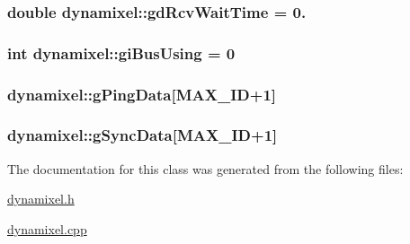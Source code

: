 \subsubsection[{gd\+Rcv\+Wait\+Time}]{\setlength{\rightskip}{0pt plus 5cm}double dynamixel\+::gd\+Rcv\+Wait\+Time = 0.\hspace{0.3cm}{\ttfamily [private]}}\label{classdynamixel_a9f47887864517d74955a2bc787ae4456}
\hypertarget{classdynamixel_ad10e0e49f5fef04bf789a89c14cc470a}{}
\subsubsection[{gi\+Bus\+Using}]{\setlength{\rightskip}{0pt plus 5cm}int dynamixel\+::gi\+Bus\+Using = 0\hspace{0.3cm}{\ttfamily [private]}}\label{classdynamixel_ad10e0e49f5fef04bf789a89c14cc470a}
\hypertarget{classdynamixel_a383bdc8f02ec1b5999f6eee94fff9ab0}{}
\subsubsection[{g\+Ping\+Data}]{ dynamixel\+::g\+Ping\+Data\mbox{[}{\bf M\+A\+X\+\_\+\+I\+D}+1\mbox{]}\hspace{0.3cm}{\ttfamily [private]}}\label{classdynamixel_a383bdc8f02ec1b5999f6eee94fff9ab0}
\hypertarget{classdynamixel_ae3f2d0b8c800b9e89271189acb4d484c}{}
\subsubsection[{g\+Sync\+Data}]{ dynamixel\+::g\+Sync\+Data\mbox{[}{\bf M\+A\+X\+\_\+\+I\+D}+1\mbox{]}\hspace{0.3cm}{\ttfamily [private]}}\label{classdynamixel_ae3f2d0b8c800b9e89271189acb4d484c}


The documentation for this class was generated from the following files\+:\begin{DoxyCompactItemize}
\item 
\hyperlink{dynamixel_8h}{dynamixel.\+h}\item 
\hyperlink{dynamixel_8cpp}{dynamixel.\+cpp}\end{DoxyCompactItemize}

